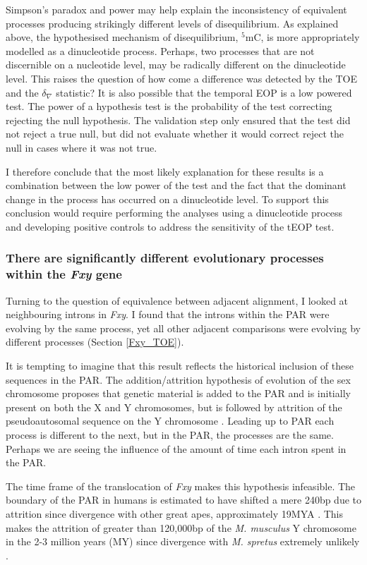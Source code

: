 Simpson's paradox and power may help explain the inconsistency of equivalent processes producing strikingly different levels of disequilibrium. As explained above, the hypothesised mechanism of disequilibrium, $^5$mC, is more appropriately modelled as a dinucleotide process. Perhaps, two processes that are not discernible on a nucleotide level, may be radically different on the dinucleotide level. This raises the question of how come a difference was detected by the TOE and the $\delta_\nabla$ statistic? It is also possible that the temporal EOP is a low powered test. The power of a hypothesis test is the probability of the test correcting rejecting the null hypothesis. The validation step only ensured that the test did not reject a true null, but did not evaluate whether it would correct reject the null in cases where it was not true. 

I therefore conclude that the most likely explanation for these results is a combination between the low power of the test and the fact that the dominant change in the process has occurred on a dinucleotide level. To support this conclusion would require performing the analyses using a dinucleotide process and developing positive controls to address the sensitivity of the tEOP test. 

\subsubsection{There are significantly different evolutionary processes within the \textit{Fxy} gene}

Turning to the question of equivalence between adjacent alignment, I looked at neighbouring introns in \textit{Fxy}. I found that the introns within the PAR were evolving by the same process, yet all other adjacent comparisons were evolving by different processes (Section \ref{Fxy_TOE}). 

It is tempting to imagine that this result reflects the historical inclusion of these sequences in the PAR. The addition/attrition hypothesis of evolution of the sex chromosome proposes that genetic material is added to the PAR and is initially present on both the X and Y chromosomes, but is followed by attrition of the pseudoautosomal sequence on the Y chromosome  \citep{Graves1995TheGenes}. Leading up to PAR each process is different to the next, but in the PAR, the processes are the same. Perhaps we are seeing the influence of the amount of time each intron spent in the PAR. 

The time frame of the translocation of \textit{Fxy} makes this hypothesis infeasible. The boundary of the PAR in humans is estimated to have shifted a mere 240bp due to attrition since divergence with other great apes, approximately 19MYA \citep{Mensah2014PseudoautosomalPopulation}. This makes the attrition of greater than 120,000bp of the \textit{M. musculus} Y chromosome in the 2-3 million years (MY) since divergence with \textit{M. spretus} extremely unlikely \citep{Huang2005HowMammals}. 

